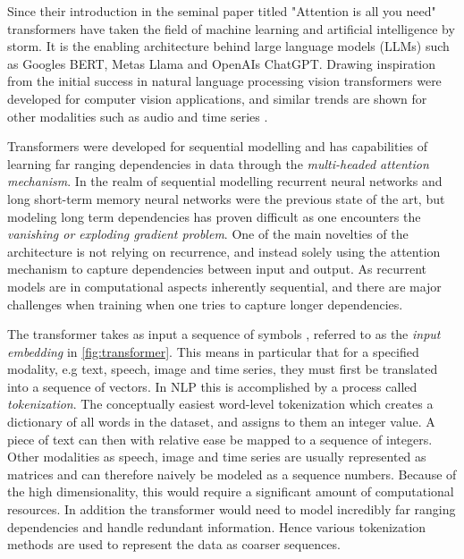 \documentclass[../../thesis.tex]{subfiles}
\begin{document}
Since their introduction in the seminal paper titled "Attention is all you need"\cite{vaswani2023attention} transformers have taken the field of machine learning and artificial intelligence by storm. It is the enabling architecture behind large language models (LLMs) such as Googles BERT, Metas Llama and OpenAIs ChatGPT. Drawing inspiration from the initial success in natural language processing vision transformers \cite{dosovitskiy2021image} were developed for computer vision applications, and similar trends are shown for other modalities such as audio \cite{latif2023transformers} and time series \cite{wen2023transformers}. \newline

Transformers were developed for sequential modelling and has capabilities of learning far ranging dependencies in data through the \textit{multi-headed attention mechanism}. In the realm of sequential modelling recurrent neural networks  and long short-term memory neural networks were the previous state of the art, but modeling long term dependencies has proven difficult \cite{279181} as one encounters the \textit{vanishing or exploding gradient problem}. One of the main novelties of the architecture is not relying on recurrence, and instead solely using the attention mechanism to capture dependencies between input and output. As recurrent models are in computational aspects inherently sequential, and there are major challenges when training when one tries to capture longer dependencies.\newline


The transformer takes as input a sequence of symbols , referred to as the \textit{input embedding} in \ref{fig:transformer}. This means in particular that for a specified modality, e.g text, speech, image and time series, they must first be translated into a sequence of vectors. In NLP this is accomplished by a process called \textit{tokenization}. The conceptually easiest word-level tokenization which creates a dictionary of all words in the dataset, and assigns to them an integer value. A piece of text can then with relative ease be mapped to a sequence of integers. Other modalities as speech, image and time series are usually represented as matrices and can therefore naively be modeled as a sequence numbers. Because of the high dimensionality, this would require a significant amount of computational resources. In addition the transformer would need to model incredibly far ranging dependencies and handle redundant information. Hence various tokenization methods are used to represent the data as coarser sequences. \newline
\end{document}
